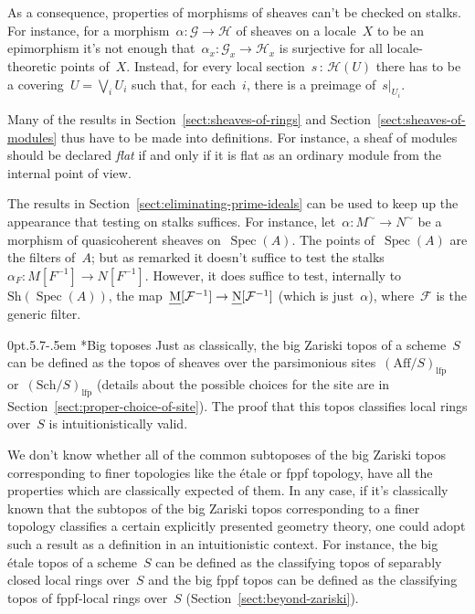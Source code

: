 \documentclass[10pt,reqno,a4paper]{amsbook}
\makeatletter
\theoremstyle{definition}
\theoremstyle{plain}
\theoremstyle{remark}
\newcommand{\F}{\mathcal{F}}
\renewcommand{\G}{\mathcal{G}}
\renewcommand{\H}{\mathcal{H}}
\let\oldul\ul
\renewcommand{\ul}[1]{\text{\oldul{$#1$}}}
\newcommand{\Sh}{\mathrm{Sh}}
\newcommand{\Sch}{\mathrm{Sch}}
\newcommand{\Aff}{\mathrm{Aff}}
\newcommand{\lfp}{\mathrm{lfp}}
\DeclareMathOperator{\Spec}{Spec}
\newcommand{\?}{\,{:}\,}
\renewcommand{\_}{\mathpunct{.}\,}
\def\subsection{\@startsection{subsection}{2}%
  {0pt}{.5\linespacing\@plus.7\linespacing}{-.5em}%
  {\normalfont\bfseries}}
\makeatother
\begin{document}
{As a consequence, properties of morphisms of sheaves can't be checked on
stalks. For instance, for a morphism~$\alpha : \G \to \H$ of sheaves on a
locale~$X$ to be an epimorphism it's not enough that~$\alpha_x : \G_x \to \H_x$
is surjective for all locale-theoretic points of~$X$. Instead, for every local
section~$s \? \H(U)$ there has to be a covering~$U = \bigvee_i U_i$ such that,
for each~$i$, there is a preimage of~$s|_{U_i}$.

Many of the results in Section~\ref{sect:sheaves-of-rings} and
Section~\ref{sect:sheaves-of-modules} thus have to be made into definitions.
For instance, a sheaf of modules should be declared \emph{flat} if and only if
it is flat as an ordinary module from the internal point of view.

The results in Section~\ref{sect:eliminating-prime-ideals} can be used to keep
up the appearance that testing on stalks suffices. For instance, let~$\alpha :
M^\sim \to N^\sim$ be a morphism of quasicoherent sheaves on~$\Spec(A)$. The
points of~$\Spec(A)$ are the filters of~$A$; but as remarked it doesn't suffice
to test the stalks~$\alpha_F : M[F^{-1}] \to N[F^{-1}]$. However, it does
suffice to test, internally to~$\Sh(\Spec(A))$, the map~$\ul{M}[\F^{-1}] \to
\ul{N}[\F^{-1}]$ (which is just~$\alpha$), where~$\F$ is the generic filter.


\subsection*{Big toposes} Just as classically, the big Zariski topos of a
scheme~$S$ can be defined as the topos of sheaves over the parsimonious
sites~$(\Aff/S)_\lfp$ or~$(\Sch/S)_\lfp$ (details about the possible choices
for the site are in Section~\ref{sect:proper-choice-of-site}). The proof that
this topos classifies local rings over~$S$ is intuitionistically valid.

We don't know whether all of the common subtoposes of the big Zariski topos
corresponding to finer topologies like the étale or fppf topology, have all the
properties which are classically expected of them. In any case, if it's
classically known that the subtopos of the big Zariski topos corresponding to
a finer topology classifies a certain explicitly presented geometry
theory, one could adopt such a result as a definition in an intuitionistic
context. For instance, the big étale topos of a scheme~$S$ can be defined as
the classifying topos of separably closed local rings over~$S$ and the big fppf
topos can be defined as the classifying topos of fppf-local rings over~$S$
(Section~\ref{sect:beyond-zariski}).


}
\end{document}
